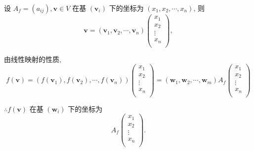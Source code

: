 \documentclass[color=black,device=normal,lang=cn,mode=geye]{elegantnote}
\begin{document}
设 $A_f=(a_{ij}),\boldsymbol{v}\in V$ 在基 $(\boldsymbol{v}_i)$ 下的坐标为 $(x_1,x_2,\cdots,x_n)$, 则
\[\boldsymbol{v}=(\boldsymbol{v}_1,\boldsymbol{v}_2,\cdots,\boldsymbol{v}_n)\begin{pmatrix}
    x_1 \\
    x_2 \\
    \vdots \\
    x_n \\
\end{pmatrix},\]

由线性映射的性质,
\[f(\boldsymbol{v})=(f(\boldsymbol{v}_1),f(\boldsymbol{v}_2),\cdots,f(\boldsymbol{v}_n))\begin{pmatrix}
    x_1 \\
    x_2 \\
    \vdots \\
    x_n \\
\end{pmatrix}=(\boldsymbol{w}_1,\boldsymbol{w}_2,\cdots,\boldsymbol{w}_m)A_f\begin{pmatrix}
    x_1 \\
    x_2 \\
    \vdots \\
    x_n \\
\end{pmatrix}\]

$\therefore f(\boldsymbol{v})$ 在基 $(\boldsymbol{w}_i)$ 下的坐标为
\[A_f\begin{pmatrix}
    x_1 \\
    x_2 \\
    \vdots \\
    x_n \\
\end{pmatrix}.\]
\end{document}
